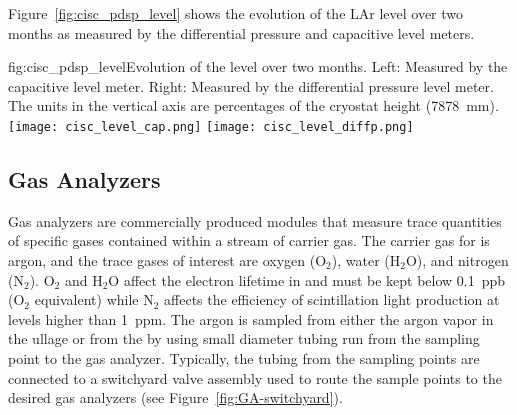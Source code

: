 




Figure~\ref{fig:cisc_pdsp_level} shows the evolution of the  LAr level over two months as measured by the differential pressure and capacitive level meters. 


\begin{dunefigure}{fig:cisc_pdsp_level}{Evolution of the  \lar level over two months. Left: Measured by the capacitive level meter. Right: Measured by the differential pressure level meter. The units in the vertical axis are percentages of the cryostat height (\SI{7878}{mm}).}
  \texttt{[image: cisc\_level\_cap.png]}%
  \hspace*{1cm}
  \texttt{[image: cisc\_level\_diffp.png]}%
\end{dunefigure}

\subsection{Gas Analyzers}
\label{sec:fdgen-slow-cryo-gas-anlyz}

 Gas analyzers are commercially produced modules that measure trace quantities of specific gases contained within a stream of carrier gas. The carrier gas for  is argon, and the trace gases of interest are oxygen ($\text{O}_2$), water ($\text{H}_2\text{O}$), and nitrogen ($\text{N}_2$). $\text{O}_2$ and $\text{H}_2\text{O}$ affect the electron lifetime in  and must be kept below \SI{0.1}{ppb} ($\text{O}_2$ equivalent) while $\text{N}_2$ affects the efficiency of scintillation light production at levels higher than \SI{1}{ppm}.
The argon is sampled from either the argon vapor in the ullage or from the  by using small diameter tubing run from the sampling point to the gas analyzer. Typically, the tubing from the sampling points are connected to a switchyard valve assembly used to route the sample points to the desired gas analyzers (see Figure~\ref{fig:GA-switchyard}).


